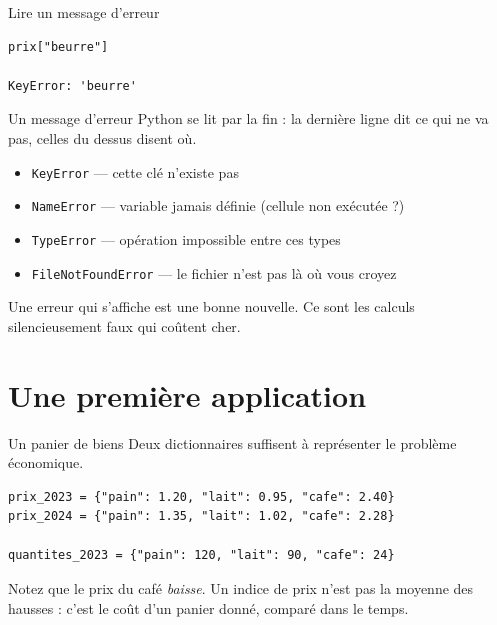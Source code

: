 \documentclass[10pt,aspectratio=169]{beamer}
\begin{document}
\begin{frame}[fragile]{Lire un message d'erreur}
\begin{lstlisting}
prix["beurre"]

KeyError: 'beurre'
\end{lstlisting}

\vspace{1em}
Un message d'erreur Python se lit \alert{par la fin} : la dernière ligne dit ce qui ne va pas, celles du dessus disent où.

\vspace{1em}
\begin{itemize}
  \item \texttt{KeyError} --- cette clé n'existe pas
  \item \texttt{NameError} --- variable jamais définie (cellule non exécutée ?)
  \item \texttt{TypeError} --- opération impossible entre ces types
  \item \texttt{FileNotFoundError} --- le fichier n'est pas là où vous croyez
\end{itemize}

\vspace{0.8em}
Une erreur qui s'affiche est une bonne nouvelle. Ce sont les calculs silencieusement faux qui coûtent cher.
\end{frame}

\section{Une première application}

\begin{frame}[fragile]{Un panier de biens}
Deux dictionnaires suffisent à représenter le problème économique.

\vspace{1em}
\begin{lstlisting}
prix_2023 = {"pain": 1.20, "lait": 0.95, "cafe": 2.40}
prix_2024 = {"pain": 1.35, "lait": 1.02, "cafe": 2.28}

quantites_2023 = {"pain": 120, "lait": 90, "cafe": 24}
\end{lstlisting}

\vspace{1.2em}
Notez que le prix du café \emph{baisse}. Un indice de prix n'est pas la moyenne des hausses : c'est le coût d'un panier donné, comparé dans le temps.
\end{frame}
\end{document}
